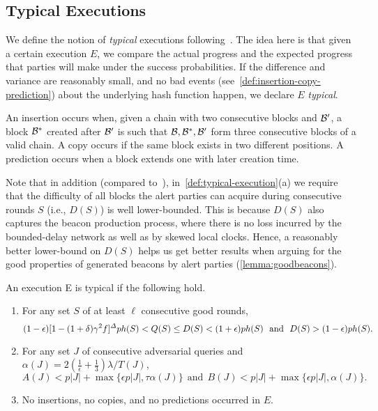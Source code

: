 \subsection{Typical Executions}
\label{subsec:typical-exeuctions}

We define the notion of \emph{typical} executions following~\cite{C:GarKiaLeo17,EPRINT:GarKiaLeo20}.
%
The idea here is that given a certain execution $E$, we compare the actual progress and the expected progress that parties will make under the success probabilities.
%
If the difference and variance are reasonably small, and no bad events (see~\cref{def:insertion-copy-prediction}) about the underlying hash function happen, we declare $E$ \emph{typical}.

\begin{definition} \label{def:insertion-copy-prediction}
    An insertion occurs when, given a chain \chain with two consecutive blocks \block and $\mathcal{B}'$, a block $\mathcal{B}^*$ created after $\mathcal{B}'$ is such that $\mathcal{B}, \mathcal{B}^*, \mathcal{B}'$ form three consecutive blocks of a valid chain.
    A copy occurs if the same block exists in two different positions.
    A prediction occurs when a block extends one with later creation time.
\end{definition}

Note that in addition (compared to~\cite{C:GarKiaLeo17,EPRINT:GarKiaLeo20}), in~\cref{def:typical-execution}(a) we require that the difficulty of all blocks the alert parties can acquire during consecutive rounds $S$ (i.e., $D(S)$) is well lower-bounded.
%
This is because $D(S)$ also captures the beacon production process, where there is no loss incurred by the bounded-delay network as well as by skewed local clocks.
%
Hence, a reasonably better lower-bound on $D(S)$ helps us get better results when arguing for the good properties of generated beacons by alert parties (\cref{lemma:goodbeacons}).

\begin{definition}
    \label{def:typical-execution}

    An execution E is typical if the following hold.
    \begin{enumerate}[label=(\alph*), leftmargin=*, noitemsep]
        \item For any set $S$ of at least $\ell$ consecutive good rounds,
              \[ (1 - \epsilon)[1 - (1 + \delta) \gamma^2 f]^\varDelta p h(S) < Q(S) \le D(S) < (1 + \epsilon) p h(S) ~~\text{and}~~ D(S) > (1 - \epsilon) p h(S). \]

        \item For any set $J$ of consecutive adversarial queries and $\alpha(J) = 2(\frac{1}{\epsilon} + \frac{1}{3})\lambda / T(J)$,
              \[ A(J) < p|J| + \max \{\epsilon p |J|, \tau \alpha(J)\} ~~\text{and}~~ B(J)< p|J| + \max \{\epsilon p |J|, \alpha(J)\}. \]

        \item No insertions, no copies, and no predictions occurred in $E$.
    \end{enumerate}
\end{definition}

